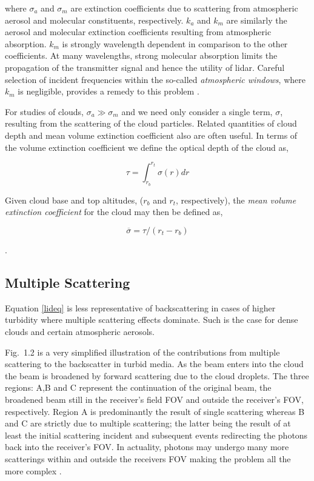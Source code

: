 \noindent
where ${\sigma_{a}}$ and ${\sigma_{m}}$ are extinction
coefficients due to scattering from atmospheric aerosol and 
molecular constituents, respectively. ${k_{a}}$ and ${k_{m}}$
are similarly the aerosol and molecular extinction
coefficients resulting from atmospheric absorption.
${k_{m}}$ is strongly wavelength dependent in comparison
to the other coefficients. At many wavelengths, strong
molecular absorption limits the propagation of
the transmitter signal and hence the utility of lidar.
Careful selection of incident frequencies within
the so-called {\em atmospheric windows}, where $k_{m}$ is
negligible, provides a remedy to this problem \cite{agc}\cite{aic2}.

For studies of clouds, $\sigma_{a} \gg \sigma_{m}$ and we need only consider 
a single term, $\sigma$, resulting from the scattering of the cloud 
particles. Related quantities
of cloud depth and mean volume 
extinction coefficient also are often useful.
In terms of the volume extinction
coefficient we define the optical depth of the cloud as, 

\begin{equation}
 \tau  = \int_{r_{b}}^{r_{t}} {\sigma}(r) dr 
\label{opdep}
\end{equation}

Given cloud base and top altitudes, 
(${r_{b}}$ and ${r_{t}}$, respectively), the 
{\em mean volume extinction coefficient} 
for the cloud may then be defined as, 

\begin{equation}
\overline{\sigma} = {\tau}/({r_{t}}-{r_{b}}) 
\label{meanex}
\end{equation}

\cite{cmrpjcsacd}. 
  
\subsection{Multiple Scattering}

Equation \ref{lideq} is less representative of backscattering 
in cases of higher turbidity where 
multiple scattering effects dominate. Such 
is the case for dense clouds and certain atmospheric aerosols.

Fig.~{1.2} is a very simplified illustration of the contributions from multiple
scattering to the backscatter in turbid media.
As the beam enters into the cloud the beam is broadened by
forward scattering due to the cloud droplets.
The three regions: A,B and C represent the continuation
of the original beam, the broadened beam still in the 
receiver's field FOV and outside the receiver's FOV,
respectively. Region A is predominantly the result of
single scattering whereas B and C are strictly due
to multiple scattering; the latter being the result
of at least the initial scattering incident and subsequent
events redirecting the photons back into the receiver's FOV.
In actuality, photons may undergo many more
scatterings within and outside the receivers FOV 
making the problem all the more complex \cite{aic1}. 

